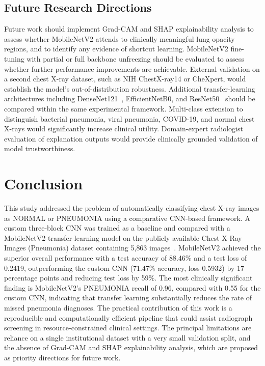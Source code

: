 \documentclass[preprint,12pt]{elsarticle}
\begin{document}
\subsection{Future Research Directions}
Future work should implement Grad-CAM and SHAP explainability analysis
to assess whether MobileNetV2 attends to clinically meaningful lung
opacity regions, and to identify any evidence of shortcut learning.
MobileNetV2 fine-tuning with partial or full backbone unfreezing should
be evaluated to assess whether further performance improvements are
achievable.
External validation on a second chest X-ray dataset, such as NIH
ChestX-ray14 or CheXpert, would establish the model's
out-of-distribution robustness.
Additional transfer-learning architectures including DenseNet121~\cite{huang2017densenet},
EfficientNetB0, and ResNet50~\cite{he2016resnet} should be compared within the same
experimental framework.
Multi-class extension to distinguish bacterial pneumonia, viral
pneumonia, COVID-19, and normal chest X-rays would significantly
increase clinical utility.
Domain-expert radiologist evaluation of explanation outputs would
provide clinically grounded validation of model trustworthiness.

\section{Conclusion}
This study addressed the problem of automatically classifying chest
X-ray images as NORMAL or PNEUMONIA using a comparative CNN-based
framework.
A custom three-block CNN was trained as a baseline and compared with a
MobileNetV2 transfer-learning model on the publicly available
Chest X-Ray Images (Pneumonia) dataset containing 5{,}863 images~\cite{kermany2018}.
MobileNetV2 achieved the superior overall performance with a test
accuracy of 88.46\% and a test loss of 0.2419, outperforming the
custom CNN (71.47\% accuracy, loss 0.5932) by 17 percentage points and
reducing test loss by 59\%.
The most clinically significant finding is MobileNetV2's PNEUMONIA
recall of 0.96, compared with 0.55 for the custom CNN, indicating that
transfer learning substantially reduces the rate of missed pneumonia
diagnoses.
The practical contribution of this work is a reproducible and
computationally efficient pipeline that could assist radiograph
screening in resource-constrained clinical settings.
The principal limitations are reliance on a single institutional
dataset with a very small validation split, and the absence of
Grad-CAM and SHAP explainability analysis, which are proposed as
priority directions for future work.



\end{document}
